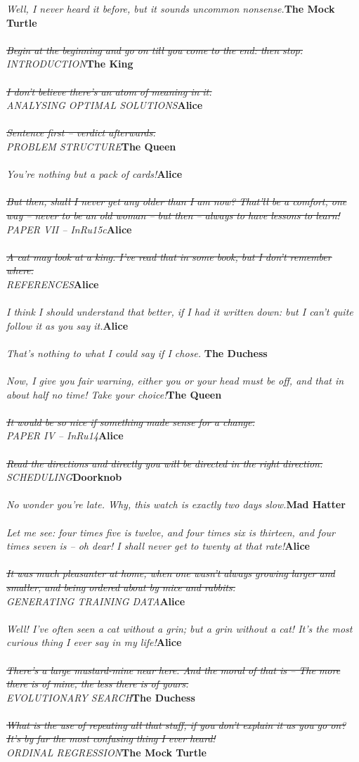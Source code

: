 \documentclass{hi-thesis}
\renewcommand{\quote}[2]{\noindent \emph{#2}\hfill{\bf #1}\\\\}
\begin{document}
\quote{The Mock Turtle}{Well, I never heard it before, but it sounds uncommon nonsense.}
\quote{The King}{\st{Begin at the beginning and go on till you come to the end: then stop.} \\INTRODUCTION}
\quote{Alice}{\st{I don't believe there's an atom of meaning in it.}\\ 
ANALYSING OPTIMAL SOLUTIONS}
\quote{The Queen}{\st{Sentence first -- verdict afterwards.}\\PROBLEM STRUCTURE}
\quote{Alice}{You're nothing but a pack of cards!}
\quote{Alice}{\st{But then, shall I never get any older than I am now? That'll 
be a comfort, one way -- never to be an old woman -- but then -- always to have 
lessons to learn!}\\PAPER VII -- InRu15c}
\quote{Alice}{\st{A cat may look at a king. I've read that in some book, but I don't remember where.}\\REFERENCES}
\quote{Alice}{I think I should understand that better, if I had it written down: but I can't quite follow it as you say it.}
\quote{The Duchess}{That's nothing to what I could say if I chose. }
\quote{The Queen}{Now, I give you fair warning, either you or your head must be off, and that in about half no time! Take your choice!}
\quote{Alice}{\st{It would be so nice if something made sense for a 
change.}\\PAPER IV -- InRu14}
\quote{Doorknob}{\st{Read the directions and directly you will be directed in the right direction.}\\SCHEDULING}
\quote{Mad Hatter}{No wonder you're late. Why, this watch is exactly two days slow.}
\quote{Alice}{Let me see: four times five is twelve, and four times six is thirteen, and four times seven is -- oh dear! I shall never get to twenty at that rate!}
\quote{Alice}{\st{It was much pleasanter at home, when one wasn't always growing larger and smaller, and being ordered about by mice and rabbits.}\\GENERATING TRAINING DATA}
\quote{Alice}{Well! I've often seen a cat without a grin; but a grin without a cat! It's the most curious thing I ever say in my life!}
\quote{The Duchess}{\st{There's a large mustard-mine near here. And the moral of that is -- The more there is of mine, the less there is of yours.}\\EVOLUTIONARY SEARCH}
\quote{The Mock Turtle}{\st{What is the use of repeating all that stuff, if you don't explain it as you go on? It's by far the most confusing thing I ever heard!}\\ORDINAL REGRESSION}
\end{document}
